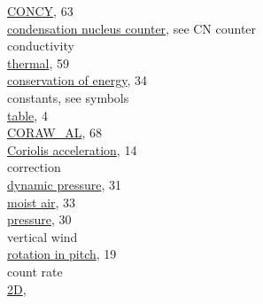 \documentclass[
  english,
]{book}
\begin{document}
\href{./5-cloud-physics-variables.html\#concentration}{CONCY}, 63\\
\href{./7-aerosol-particle-measurements.html\#condensation-nucleus-counter}{condensation
nucleus counter}, see CN counter\\
conductivity\\
\hspace*{0.333em}\hspace*{0.333em}\href{./5-cloud-physics-variables.html\#plwcc}{thermal},
59\\
\href{./4-the-state-of-the-atmosphere.html\#ATX}{conservation of
energy}, 34\\
constants, see symbols\\
\hspace*{0.333em}\hspace*{0.333em}\href{./1-introduction.html\#constants-and-symbols}{table},
4\\
\href{./6-air-chemistry-measurements.html\#coraw-al}{CORAW\_AL}, 68\\
\href{./3-the-state-of-the-aircraft.html\#wp3}{Coriolis acceleration},
14\\
correction\\
\hspace*{0.333em}\hspace*{0.333em}\href{./4-the-state-of-the-atmosphere.html\#qcx}{dynamic
pressure}, 31\\
\hspace*{0.333em}\hspace*{0.333em}\href{./4-the-state-of-the-atmosphere.html\#ambient-t}{moist
air}, 33\\
\hspace*{0.333em}\hspace*{0.333em}\href{./4-the-state-of-the-atmosphere.html\#psx}{pressure},
30\\
\hspace*{0.333em}\hspace*{0.333em}vertical wind\\
\hspace*{0.333em}\hspace*{0.333em}\hspace*{0.333em}\hspace*{0.333em}\href{./4-the-state-of-the-atmosphere.html\#wind}{rotation
in pitch}, 19\\
count rate\\
\hspace*{0.333em}\hspace*{0.333em}\href{./5-cloud-physics-variables.html\#a1dc-a1dp}{2D},
\end{document}
